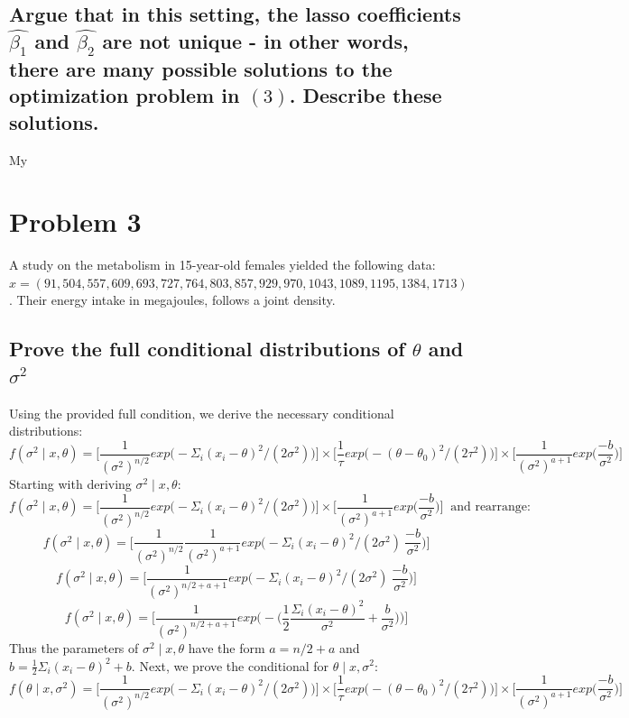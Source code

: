 \documentclass[20pt]{article} %
\begin{document}
\subsection{Argue that in this setting, the lasso coefficients $\hat{\beta_1}$ and $\hat{\beta_2}$ are not unique - in other words, there are many possible solutions to the optimization problem in $(3)$. Describe these solutions.}
My 

\section{Problem 3}
A study on the metabolism in 15-year-old females yielded the following data:
$x = (91, 504, 557, 609, 693, 727, 764, 803, 857, 929, 970, 1043, 1089, 1195, 1384, 1713)$.  Their energy intake in megajoules, follows a joint density.
\subsection{Prove the full conditional distributions of $\theta$ and $\sigma^{2}$}
Using the provided full condition, we derive the necessary conditional distributions:
$$f(\sigma^{2} \mid x, \theta) = \Bigg[ \frac{1}{(\sigma^{2})^{n/2}}exp\Bigg( -\Sigma_i (x_i - \theta)^{2} / (2\sigma^{2}) \Bigg) \Bigg] \times \Bigg[ \frac{1}{\tau} exp \Bigg( -(\theta - \theta_0)^{2} / (2\tau^{2}) \Bigg) \Bigg] \times \Bigg[ \frac{1}{(\sigma^{2})^{a+1}}exp\Bigg( \frac{-b}{\sigma^{2}} \Bigg) \Bigg]$$
Starting with deriving $\sigma^{2} \mid x, \theta$:
$$f(\sigma^{2} \mid x, \theta) = \Bigg[ \frac{1}{(\sigma^{2})^{n/2}}exp\Bigg( -\Sigma_i (x_i - \theta)^{2} / (2\sigma^{2}) \Bigg) \Bigg] \times \Bigg[ \frac{1}{(\sigma^{2})^{a+1}}exp\Bigg( \frac{-b}{\sigma^{2}} \Bigg) \Bigg] \ \text{ and rearrange:}$$
$$f(\sigma^{2} \mid x, \theta)= \Bigg[ \frac{1}{(\sigma^{2})^{n/2}} \frac{1}{(\sigma^{2})^{a+1}}exp\Bigg( -\Sigma_i (x_i - \theta)^{2} / (2\sigma^{2}) \ \frac{-b}{\sigma^{2}} \Bigg) \Bigg]$$
$$f(\sigma^{2} \mid x, \theta)= \Bigg[ \frac{1}{(\sigma^{2})^{n/2 + a + 1}} exp\Bigg( -\Sigma_i (x_i - \theta)^{2} / (2\sigma^{2}) \ \frac{-b}{\sigma^{2}} \Bigg) \Bigg]$$
$$f(\sigma^{2} \mid x, \theta)= \Bigg[ \frac{1}{(\sigma^{2})^{n/2 + a + 1}} exp\Bigg( - \Bigg( \frac{1}{2} \frac{\Sigma_i (x_i - \theta)^{2}}{\sigma^{2}} + \frac{b}{\sigma^{2}} \Bigg) \Bigg) \Bigg]$$
Thus the parameters of $\sigma^{2} \mid x, \theta$ have the form $a = n/2 + a$ and $b = \frac{1}{2} \Sigma_i (x_i - \theta)^{2} + b$. Next, we prove the conditional for $\theta \mid x, \sigma^{2}$:
$$f(\theta \mid x, \sigma^{2}) = \Bigg[ \frac{1}{(\sigma^{2})^{n/2}}exp\Bigg( -\Sigma_i (x_i - \theta)^{2} / (2\sigma^{2}) \Bigg) \Bigg] \times \Bigg[ \frac{1}{\tau} exp \Bigg( -(\theta - \theta_0)^{2} / (2\tau^{2}) \Bigg) \Bigg] \times \Bigg[ \frac{1}{(\sigma^{2})^{a+1}}exp\Bigg( \frac{-b}{\sigma^{2}} \Bigg) \Bigg]$$
\end{document}
